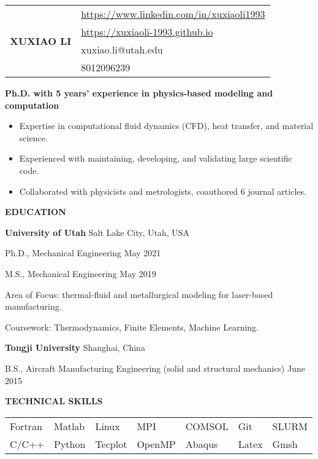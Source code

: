 \documentclass[11pt, letterpaper]{article}
\begin{document}
\begin{tabular}{@{} p{} p{} @{}}
   \multirow{4}{*}{{\textbf{\huge XUXIAO LI}}} & 
    \href{https://www.linkedin.com/in/xuxiaoli1993}{https://www.linkedin.com/in/xuxiaoli1993} \\
     & \href{https://xuxiaoli-1993.github.io}{https://xuxiaoli-1993.github.io} \\
     & xuxiao.li@utah.edu \\
     & 8012096239
\end{tabular}

\vspace{24pt}

\textbf{Ph.D. with 5 years' experience in physics-based modeling and computation}
\begin{itemize}[leftmargin=*, labelsep=5mm]
   \item Expertise in computational fluid dynamics (CFD), heat transfer, and material science.
   \item Experienced with maintaining, developing, and validating large scientific code.
   \item Collaborated with physicists and metrologists, coauthored 6 journal articles.
\end{itemize}

\vspace{12pt}

\textbf{EDUCATION}

\fullrule

\textbf{University of Utah} \hfill Salt Lake City, Utah, USA

Ph.D., Mechanical Engineering  \hfill May 2021

M.S., Mechanical Engineering  \hfill May 2019

Area of Focus: thermal-fluid and metallurgical modeling for laser-based manufacturing.

Coursework: Thermodynamics, Finite Elements, Machine Learning.

\vskip 6pt

\textbf{Tongji University} 
\hfill
Shanghai, China

B.S., Aircraft Manufacturing Engineering (solid and structural mechanics) \hfill June 2015

\vskip 9pt

\textbf{TECHNICAL SKILLS}

\fullrule

\vskip 3pt

\begin{tabular}{@{} l l l l l l l @{}}
   Fortran & Matlab & Linux & MPI & COMSOL & Git & SLURM \\
   C/C++ & Python & Tecplot & OpenMP & Abaqus & Latex & Gmsh
\end{tabular}
\end{document}
